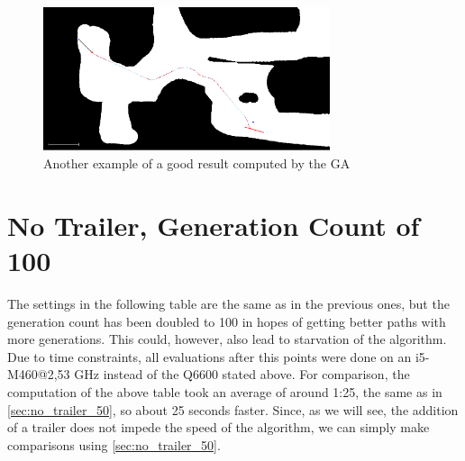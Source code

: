 \begin{figure}[b]
\centering
\includegraphics[width=0.75\textwidth]{./Chapters/Figures/example_good_path2.png}
\caption{Another example of a good result computed by the GA\label{pic:example_good_path2}}
\end{figure}


\section{No Trailer, Generation Count of 100}
\label{sec:no_trailer_100}

The settings in the following table are the same as in the previous ones, but the generation count has been doubled to 100 in hopes of getting better paths with more generations. This could, however, also lead to starvation of the algorithm.\\
Due to time constraints, all evaluations after this points were done on an i5-M460@2,53 GHz instead of the Q6600 stated above. For comparison, the computation of the above table took an average of around 1:25, the same as in \ref{sec:no_trailer_50}, so about 25 seconds faster. Since, as we will see, the addition of a trailer does not impede the speed of the algorithm, we can simply make comparisons using \ref{sec:no_trailer_50}.

